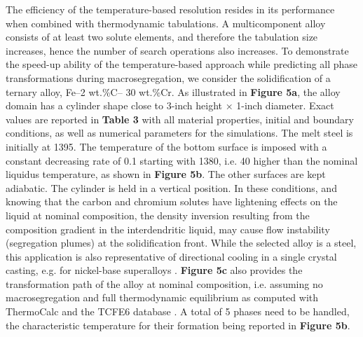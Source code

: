 The efficiency of the temperature-based resolution resides in its performance when combined with 
thermodynamic tabulations. A multicomponent alloy consists of at least two solute elements, and 
therefore the tabulation size increases, hence the number of search operations also increases. 
To demonstrate the speed-up ability of the temperature-based approach while predicting all phase 
transformations during macrosegregation, we consider the solidification of a ternary alloy, Fe–2 wt.\%C– 30 wt.\%Cr. 
As illustrated in \textbf{Figure 5a}, the alloy domain has a cylinder shape close to 3-inch height × 1-inch diameter. 
Exact values are reported in \textbf{Table 3} with all material properties, initial and boundary conditions, 
as well as numerical parameters for the simulations. The melt steel is initially at \SI{1395}{\udegC}. The 
temperature of the bottom surface is imposed with a constant decreasing rate of \SI{0.1}{\uCR} starting 
with \SI{1380}{\udegC}, i.e. \SI{40}{\udegC} higher than the nominal liquidus temperature, as shown 
in \textbf{Figure 5b}. The other surfaces are kept adiabatic. The cylinder is held in a vertical position. 
In these conditions, and knowing that the carbon and chromium solutes have lightening effects on the liquid 
at nominal composition, the density inversion resulting from the composition gradient in the interdendritic 
liquid, may cause flow instability (segregation plumes) at the solidification front. While the selected alloy 
is a steel, this application is also representative of directional cooling in a single crystal casting, e.g. 
for nickel-base superalloys \citep{beckermann_development_2000}. \textbf{Figure 5c} also provides the 
transformation path of the alloy at nominal composition, i.e. assuming no macrosegregation and full 
thermodynamic equilibrium as computed with ThermoCalc and the TCFE6 database \citep{thermo-calc_andersson, tcfe6}. 
A total of 5 phases need to be handled, the characteristic temperature for their formation being reported 
in \textbf{Figure 5b}.
 
